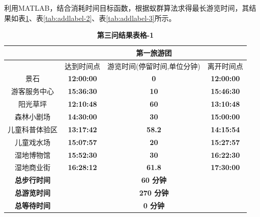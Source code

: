 \documentclass[hyperref,UTF8]{article}
\begin{document}
{利用MATLAB，结合消耗时间目标函数，根据蚁群算法求得最长游览时间，其结果如表\ref{tab:addlabel-1}、表\ref{tab:addlabel-2}、表\ref{tab:addlabel-3}所示。


\begin{table}[htbp]
  \centering
  \caption{\textbf{第三问结果表格-1}}
    \begin{tabular}{|c|c|c|c|}
    \hline
    \multicolumn{1}{|c|}{} & \multicolumn{3}{c|}{\textbf{第一旅游团}} \bigstrut\\
    \hline
    \multicolumn{1}{|c|}{} & 达到时间点 & \multicolumn{1}{p{4.055em}|}{游览时间(停留时间,单位分钟)} & \multicolumn{1}{p{4.055em}|}{离开时间点} \bigstrut\\
    \hline
    景石 & \multicolumn{1}{c|}{\textbf{12:00:00}} & \textbf{0} & \textbf{12:00:00} \bigstrut\\
    \hline
    游客服务中心 & \multicolumn{1}{c|}{\textbf{15:36:30}} & \textbf{10} & \textbf{15:46:30} \bigstrut\\
    \hline
    阳光草坪 & \multicolumn{1}{c|}{\textbf{12:10:48}} & \textbf{60} & \textbf{13:10:48} \bigstrut\\
    \hline
    森林小剧场 & \multicolumn{1}{c|}{\textbf{14:30:00}} & \textbf{30} & \textbf{15:00:00} \bigstrut\\
    \hline
    儿童科普体验区 & \multicolumn{1}{c|}{\textbf{13:17:42}} & \textbf{58.2} & \textbf{14:15:54} \bigstrut\\
    \hline
    儿童戏水场 & \multicolumn{1}{c|}{\textbf{15:07:57}} & \textbf{20} & \textbf{15:27:57} \bigstrut\\
    \hline
    湿地博物馆 & \multicolumn{1}{c|}{\textbf{15:52:30}} & \textbf{30} & \textbf{16:22:30} \bigstrut\\
    \hline
    湿地商业街 & \multicolumn{1}{c|}{\textbf{16:28:12}} & \textbf{61.8} & \textbf{17:30:00} \bigstrut\\
    \hline
    \textbf{总步行时间} & \multicolumn{3}{c|}{\textbf{60  分钟}} \bigstrut\\
    \hline
    \textbf{总游览时间} & \multicolumn{3}{c|}{\textbf{270 分钟}} \bigstrut\\
    \hline
    \textbf{总等待时间} & \multicolumn{3}{c|}{\textbf{0 分钟}} \bigstrut\\
    \hline
    \end{tabular}%
  \label{tab:addlabel-1}%
\end{table}%

}
\end{document}
